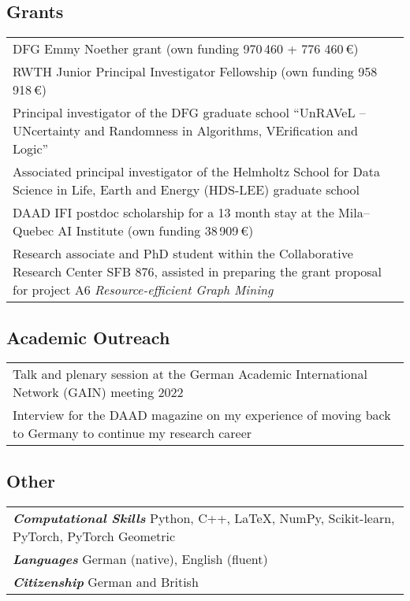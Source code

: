 \documentclass[11pt, a4paper, DIV=14, headings=small]{scrartcl}
\begin{document}
	\subsection*{Grants}
	\begin{tabular}{p{14.5cm}}
		DFG Emmy Noether grant (own funding 970\,460 + 776 460\,€)                                                 \\[0.5em]
		
		RWTH Junior Principal Investigator Fellowship (own funding 958\,918\,€)                                    \\[0.5em]
		
		Principal investigator of the DFG graduate school ``UnRAVeL -- UNcertainty and Randomness in Algorithms, VErification and Logic''  \\[1.5em]
		
		Associated principal investigator of the Helmholtz School for Data Science in Life, Earth and Energy (HDS-LEE) graduate school  \\[1.5em]
		
		DAAD IFI postdoc scholarship for a 13 month stay at the Mila--Quebec AI Institute (own funding 38\,909\,€) \\[1.5em]
		
		Research associate and PhD student  within the Collaborative Research Center SFB 876, assisted in preparing the  grant proposal for project A6 \emph{Resource-efficient Graph Mining}\\
	\end{tabular}
	
	\subsection*{Academic Outreach}
	\begin{tabular}{p{14.5cm}}
		Talk and plenary session at the German Academic International Network (GAIN) meeting 2022 \\[0.5em]
		
		Interview for the DAAD magazine on my experience of moving back to Germany to continue my research career
	\end{tabular}
	
	\subsection*{Other}
	
	\begin{tabular}{l}
		\textsf{\textbf{\em Computational Skills}} Python, C\hspace{-1pt}+\hspace{-1pt}+, \LaTeX, NumPy, Scikit-learn, PyTorch, PyTorch Geometric \\[0.2em]
		\textsf{\textbf{\em Languages}} German (native), English (fluent)                                                                         \\[0.2em]
		\textsf{\textbf{\em Citizenship}} German and British\\
	\end{tabular}
	
\end{document}
